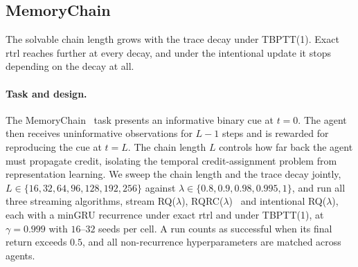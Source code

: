 \documentclass{article}
\begin{document}
\subsection{MemoryChain}

The solvable chain length grows with the trace decay under TBPTT(1). Exact \gls{rtrl} reaches further at every decay, and under the intentional update it stops depending on the decay at all.
\label{sec:memory_chain}
 
\paragraph{Task and design.}
The MemoryChain~\citep{osband2020bsuite} task presents an informative binary cue at $t{=}0$.
The agent then receives uninformative observations for $L{-}1$ steps and is rewarded for reproducing the cue at $t{=}L$.
The chain length $L$ controls how far back the agent must propagate credit, isolating the temporal credit-assignment problem from representation learning.
We sweep the chain length and the trace decay jointly, $L \in \{16, 32, 64, 96, 128, 192,
256\}$ against $\lambda \in \{0.8, 0.9, 0.98, 0.995, 1\}$, and run all three streaming
algorithms, stream RQ($\lambda$), RQRC($\lambda$)~\citep{elelimy2025deep} and intentional
RQ($\lambda$), each with a minGRU recurrence under exact \gls{rtrl} and under TBPTT(1), at
$\gamma{=}0.999$ with $16$--$32$ seeds per cell. A run counts as successful when its final
return exceeds $0.5$, and all non-recurrence hyperparameters are matched across agents.
 
\end{document}
